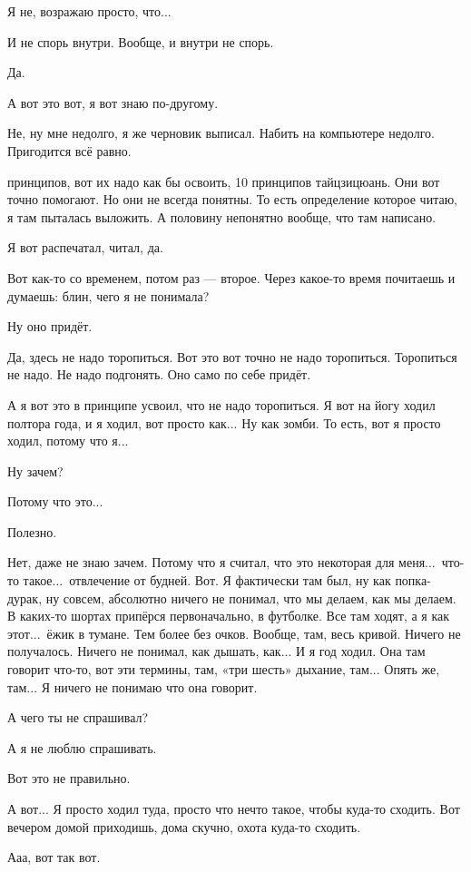 \I
Я не, возражаю просто, что...

\M
И не спорь внутри. Вообще, и внутри не спорь.

\I
Да.

\M
А вот это вот, я вот знаю по-другому.

\I
Не, ну мне недолго, я же черновик выписал.
Набить на компьютере недолго. Пригодится всё равно.

 принципов, вот их надо как бы освоить, 10 принципов тайцзицюань. Они вот точно помогают.
Но они не всегда понятны. То есть определение которое
читаю, я там пыталась выложить. А половину непонятно
вообще, что там написано.

\I
Я вот распечатал, читал, да.

\M
Вот как-то со временем, потом раз --- второе. Через какое-то время почитаешь и думаешь:
блин, чего я не понимала?

\I
Ну оно придёт.

\M
Да, здесь не надо торопиться.
Вот это вот точно не надо торопиться.
Торопиться не надо. Не надо подгонять.
Оно само по себе придёт.

\I
А я вот это в принципе усвоил, что не надо торопиться. Я вот на йогу ходил полтора года,
и я ходил, вот просто как... Ну как зомби. То есть, вот я
просто ходил, потому что я...

\M
Ну зачем?

\I
Потому что это...

\M
Полезно.

\I
Нет, даже не знаю зачем.
Потому что я считал, что это некоторая для меня...\ что-то такое...\ отвлечение от будней.
Вот. Я фактически там был, ну как попка-дурак, ну совсем,
абсолютно ничего не понимал, что мы делаем, как мы делаем.
В каких-то шортах припёрся первоначально, в футболке. Все там ходят, а я как этот...\ ёжик
в тумане.
Тем более без очков.
Вообще, там, весь кривой.
Ничего не получалось.
Ничего не понимал, как дышать, как... И я год ходил.
Она там говорит что-то, вот эти термины, там, «три шесть» дыхание, там...
Опять же, там...
Я ничего не понимаю что она говорит.

\M
А чего ты не спрашивал?

\I
А я не люблю спрашивать.

\M
Вот это не правильно.

\I
А вот...
Я просто ходил туда, просто что нечто такое, чтобы куда-то сходить.
Вот вечером домой приходишь, дома скучно, охота куда-то сходить.

\M
Ааа, вот так вот.


